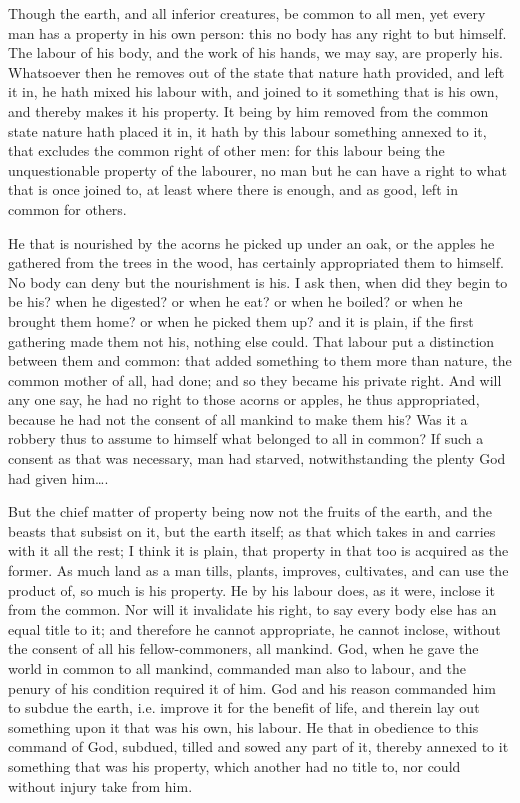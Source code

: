 
Though the earth, and all inferior creatures, be common to all men, yet every
man has a property in his own person: this no body has any right to but himself.
The labour of his body, and the work of his hands, we may say, are properly his.
Whatsoever then he removes out of the state that nature hath provided, and left
it in, he hath mixed his labour with, and joined to it something that is his
own, and thereby makes it his property. It being by him removed from the common
state nature hath placed it in, it hath by this labour something annexed to it,
that excludes the common right of other men: for this labour being the
unquestionable property of the labourer, no man but he can have a right to what
that is once joined to, at least where there is enough, and as good, left in
common for others.

He that is nourished by the acorns he picked up under an oak, or the apples he
gathered from the trees in the wood, has certainly appropriated them to himself.
No body can deny but the nourishment is his. I ask then, when did they begin to
be his? when he digested? or when he eat? or when he boiled? or when he brought
them home? or when he picked them up? and it is plain, if the first gathering
made them not his, nothing else could. That labour put a distinction between
them and common: that added something to them more than nature, the common
mother of all, had done; and so they became his private right. And will any one
say, he had no right to those acorns or apples, he thus appropriated, because he
had not the consent of all mankind to make them his? Was it a robbery thus to
assume to himself what belonged to all in common? If such a consent as that was
necessary, man had starved, notwithstanding the plenty God had given him\ldots .

But the chief matter of property being now not the fruits of the earth, and the
beasts that subsist on it, but the earth itself; as that which takes in and
carries with it all the rest; I think it is plain, that property in that too is
acquired as the former. As much land as a man tills, plants, improves,
cultivates, and can use the product of, so much is his property. He by his
labour does, as it were, inclose it from the common. Nor will it invalidate his
right, to say every body else has an equal title to it; and therefore he cannot
appropriate, he cannot inclose, without the consent of all his fellow-commoners,
all mankind. God, when he gave the world in common to all mankind, commanded man
also to labour, and the penury of his condition required it of him. God and his
reason commanded him to subdue the earth, i.e. improve it for the benefit of
life, and therein lay out something upon it that was his own, his labour. He
that in obedience to this command of God, subdued, tilled and sowed any part of
it, thereby annexed to it something that was his property, which another had no
title to, nor could without injury take from him.

